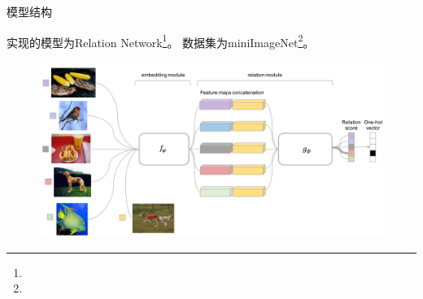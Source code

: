 \documentclass[algorithm,pgfplots]{cuzbeamer}
\begin{document}
    \begin{frame}{模型结构}
        \begin{leftbar}            
            实现的模型为Relation Network\footnote{}。
            数据集为miniImageNet\footnote{}。
        \end{leftbar}
        \begin{figure}[h]
            \includegraphics[scale=0.24]{figure/compare.png}
        \end{figure}
    \end{frame}
\end{document}
